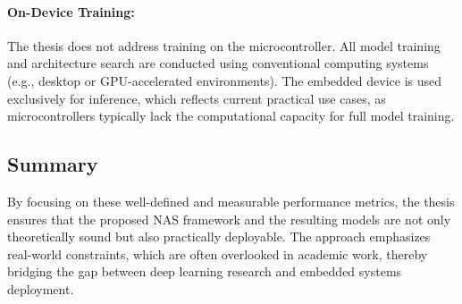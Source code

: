

\paragraph{\textbf{On-Device Training}:}
The thesis does not address training on the microcontroller. All model training and architecture search are conducted using conventional computing systems (e.g., desktop or GPU-accelerated environments). The embedded device is used exclusively for inference, which reflects current practical use cases, as microcontrollers typically lack the computational capacity for full model training.

\subsection{\textbf{Summary}}

By focusing on these well-defined and measurable performance metrics, the thesis ensures that the proposed NAS framework and the resulting models are not only theoretically sound but also practically deployable. The approach emphasizes real-world constraints, which are often overlooked in academic work, thereby bridging the gap between deep learning research and embedded systems deployment.


